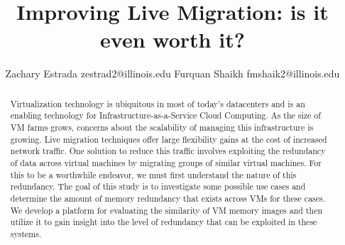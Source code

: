 \documentclass{acm_proc_article-sp}
\begin{document}
\title{Improving Live Migration: is it even worth it?}
%
%
%
%

%
\author{
%
%
\alignauthor
Zachary Estrada
\email zestrad2@illinois.edu
\alignauthor
Furquan Shaikh
\email fmshaik2@illinois.edu
}

\maketitle
\begin{abstract}
Virtualization technology is ubiquitous in most of today's datacenters and is an enabling technology for Infrastructure-as-a-Service Cloud Computing.  As the size of VM farms grows, concerns about the scalability of managing this infrastructure is growing.  Live migration techniques offer large flexibility gains at the cost of increased network traffic.  One solution to reduce this traffic involves exploiting the redundancy of data across virtual machines by migrating groups of similar virtual machines.  For this to be a worthwhile endeavor, we must first understand the nature of this redundancy.  The goal of this study is to investigate some possible use cases and determine the amount of memory redundancy that exists across VMs for these cases.  We develop a platform for evaluating the similarity of VM memory images and then utilize it to gain insight into the level of redundancy that can be exploited in these systems.
\end{abstract}
\end{document}
